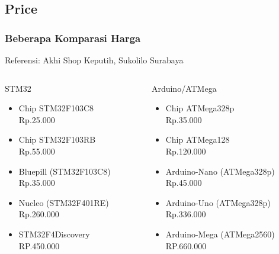\documentclass[table,dvipsnames]{beamer}
\begin{document}
	\subsection{Price}
	\begin{frame}
		\frametitle{Beberapa Komparasi Harga}
		\begin{exampleblock}{}
			Referensi: Akhi Shop Keputih, Sukolilo Surabaya
		\end{exampleblock}
		\begin{columns}[T]
			\begin{column}{.48\textwidth}
				STM32
				\begin{itemize}
					\item Chip STM32F103C8\\Rp.25.000
					\item Chip STM32F103RB\\Rp.55.000
					\item Bluepill (STM32F103C8)\\Rp.35.000
					\item Nucleo (STM32F401RE)\\Rp.260.000
					\item STM32F4Discovery\\RP.450.000
				\end{itemize}
			\end{column}
			\begin{column}{.48\textwidth}
				Arduino/ATMega
				\begin{itemize}
					\item Chip ATMega328p\\Rp.35.000
					\item Chip ATMega128\\Rp.120.000
					\item Arduino-Nano (ATMega328p)\\Rp.45.000
					\item Arduino-Uno (ATMega328p)\\Rp.336.000
					\item Arduino-Mega (ATMega2560)\\RP.660.000
				\end{itemize}
			\end{column}
		\end{columns}
	\end{frame}
\end{document}
